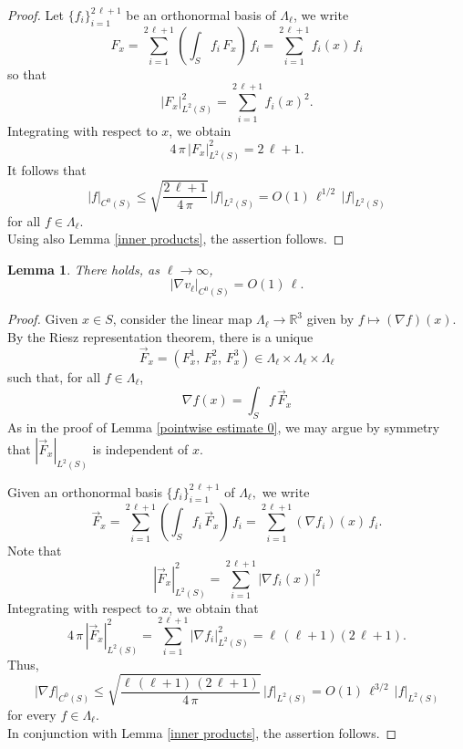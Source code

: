 \documentclass[11pt]{amsart}
\newtheorem{lemma}[theorem]{Lemma}
\theoremstyle {definition}
\newcommand{\RR}{\mathbb{R}}
\begin{document}
\begin{appendices}
\begin{proof}
Let $\{f_i\}_{i=1}^{2\,\ell+1}$ be an orthonormal basis of $\Lambda_\ell$, we write
	\[
	F_x = \sum_{i=1}^{2\,\ell+1} \left(\int_S f_i\,F_x\right)\,f_i =  \sum_{i=1}^{2\,\ell+1} f_i(x)\, f_i
	\]
	so that
	\[
	| F_x |_{L^2(S)}^2 =  \sum_{i=1}^{2\,\ell+1} f_i(x)^2.
	\]
	Integrating with respect to $x$, we obtain
	\[
	4\,\pi\, | F_x|_{L^2(S)}^2 = 2\,\ell+1.
	\]
It follows that
	\[
	| f|_{C^0(S)} \leq \sqrt{\frac{2\,\ell+1 }{4\,\pi }}\, | f |_{L^2(S)} =O(1)\,\ell^{1/2}\,|f|_{L^2(S)}
	\]
	for all $f \in \Lambda_\ell$. \\	\indent Using also Lemma \ref{inner products}, the assertion follows. 
	\end{proof}  
	\begin{lemma} \label{pointwise estimate 1}
		There holds, as $\ell\to\infty$,
		$$
		|\nabla v_\ell|_{C^0(S)}=O(1)\,\ell.
		$$
	\end{lemma}
\begin{proof} 
	Given $x \in S$, consider the linear map $\Lambda_\ell \to \RR^3$ given by $f\mapsto (\nabla f)(x)$. By the Riesz representation theorem, there is a unique $$\vec F_x=(F_x^1,\,F_x^2,\,F_x^3) \in \Lambda_\ell\times \Lambda_\ell\times \Lambda_\ell$$ such that, for all $f\in \Lambda_\ell$,
	\[
	\nabla f(x) = \int_Sf\,\vec F_x 
	\]
As in the proof of Lemma \ref{pointwise estimate 0}, we may argue by symmetry that  $| \vec F_x|_{L^2(S)}$ is independent of $x$. 
	
	Given an orthonormal basis $\{f_i\}_{i=1}^{2\,\ell+1}$ of $\Lambda_\ell,$ we write
	\[
	\vec F_x = \sum_{i=1}^{2\,\ell+1}   \left(\int_S f_i\,\vec F_x\right)\,f_i = \sum_{i=1}^{2\,\ell+1} (\nabla f_i)(x)\, f_i.
	\]
	Note that 
	\[
	| \vec F_x|_{L^2(S)}^2 = \sum_{i=1}^{2\,\ell+1} | \nabla f_i(x)|^2 
	\]
	Integrating with respect to $x$, we obtain that
	\[
	4\,\pi \,|\vec F_x|_{L^2(S)}^2 = \sum_{i=1}^{2\,\ell+1} | \nabla f_i|_{L^2(S)}^2 = \ell\,(\ell+1) (2\,\ell+1).  
	\]
	Thus,
	\[
	| \nabla f|_{C^0(S)} \leq \sqrt{\frac{\ell\,(\ell+1)\,(2\,\ell+1)}{4\,\pi}}\, | f |_{L^2(S)} =O(1)\,\ell^{3/2} \,| f |_{L^2(S)} 
	\]
	for every $f \in \Lambda_\ell$. \\
	\indent In conjunction with Lemma \ref{inner products}, the assertion follows. 
	\end{proof} 

\end{appendices}
\end{document}
